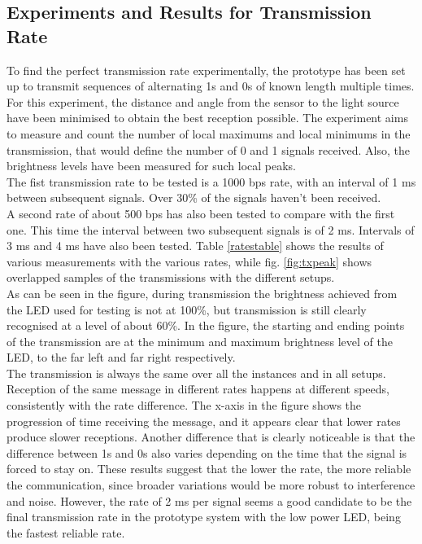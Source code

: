\subsection{Experiments and Results for Transmission Rate}
\label{tr:rate:exp}

To find the perfect transmission rate experimentally, the prototype has been set up to transmit sequences of alternating 1s and 0s of known length multiple times.
For this experiment, the distance and angle from the sensor to the light source have been minimised to obtain the best reception possible.
The experiment aims to measure and count the number of local maximums and local minimums in the transmission, that would define the number of 0 and 1 signals received.
Also, the brightness levels have been measured for such local peaks.\\
The fist transmission rate to be tested is a 1000 bps rate, with an interval of 1 ms between subsequent signals.
Over 30\% of the signals haven't been received.\\
A second rate of about 500 bps has also been tested to compare with the first one.
This time the interval between two subsequent signals is of 2 ms.
Intervals of 3 ms and 4 ms have also been tested.
Table \ref{ratestable} shows the results of various measurements with the various rates, while fig. \ref{fig:txpeak} shows overlapped samples of the transmissions with the different setups.\\
As can be seen in the figure, during transmission the brightness achieved from the LED used for testing is not at 100\%, but transmission is still clearly recognised at a level of about 60\%. 
In the figure, the starting and ending points of the transmission are at the minimum and maximum brightness level of the LED, to the far left and far right respectively.\\
The transmission is always the same over all the instances and in all setups.
Reception of the same message in different rates happens at different speeds, consistently with the rate difference.
The x-axis in the figure shows the progression of time receiving the message, and it appears clear that lower rates produce slower receptions.
Another difference that is clearly noticeable is that the difference between 1s and 0s also varies depending on the time that the signal is forced to stay on.
These results suggest that the lower the rate, the more reliable the communication, since broader variations would be more robust to interference and noise.
However, the rate of 2 ms per signal seems a good candidate to be the final transmission rate in the prototype system with the low power LED, being the fastest reliable rate.
